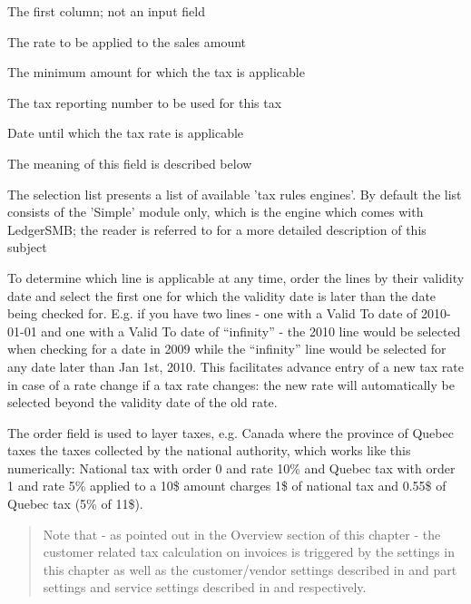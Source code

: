 \begin{description}[style=nextline]
\item [Account name] The first column; not an input field
\item [Rate (\%)] The rate to be applied to the sales amount
\item [Min Taxable] The minimum amount for which the tax is applicable
\item [Number] The tax reporting number to be used for this tax
\item [Valid To] Date until which the tax rate is applicable
\item [Ordering] The meaning of this field is described below
\item [Tax Rules] The selection list presents a list of available 'tax rules engines'. By
   default the list consists of the 'Simple' module only, which is the engine which comes
   with LedgerSMB; the reader is referred to  for a more detailed
   description of this subject
\end{description}

To determine which line is applicable at any time, order the lines by their validity date and
select the first one for which the validity date is later than the date being checked for. E.g.
if you have two lines - one with a Valid To date of 2010-01-01 and one with a Valid To date of
``infinity'' - the 2010 line would be selected when checking for a date in 2009 while the ``infinity''
line would be selected for any date later than Jan 1st, 2010. This facilitates advance entry of a new
tax rate in case of a rate change if a tax rate changes: the new rate will automatically be selected
beyond the validity date of the old rate.

The order field is used to layer taxes, e.g. Canada where the province of Quebec taxes
the taxes collected by the national authority, which works like this numerically:
National tax with order 0 and rate 10\% and Quebec tax with order 1 and rate 5\%
applied to a 10\$ amount charges 1\$ of national tax and 0.55\$ of Quebec tax (5\% of 11\$).

\begin{quote}
Note that - as pointed out in the Overview section of this chapter - the \gls{customer} related
tax calculation on invoices is triggered by the settings in this chapter as well as
the customer/vendor settings described in 
and part settings and service settings described in  and
 respectively.
\end{quote}

